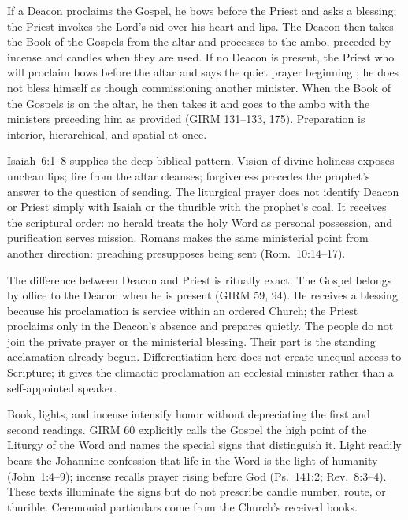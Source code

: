 
If a Deacon proclaims the Gospel, he bows before the Priest and asks a blessing; the Priest invokes the Lord's aid over his heart and lips. The Deacon then takes the Book of the Gospels from the altar and processes to the ambo, preceded by incense and candles when they are used. If no Deacon is present, the Priest who will proclaim bows before the altar and says the quiet prayer beginning ; he does not bless himself as though commissioning another minister. When the Book of the Gospels is on the altar, he then takes it and goes to the ambo with the ministers preceding him as provided (GIRM 131--133, 175). Preparation is interior, hierarchical, and spatial at once.

Isaiah~6:1--8 supplies the deep biblical pattern. Vision of divine holiness exposes unclean lips; fire from the altar cleanses; forgiveness precedes the prophet's answer to the question of sending. The liturgical prayer does not identify Deacon or Priest simply with Isaiah or the thurible with the prophet's coal. It receives the scriptural order: no herald treats the holy Word as personal possession, and purification serves mission. Romans makes the same ministerial point from another direction: preaching presupposes being sent (Rom.~10:14--17).

The difference between Deacon and Priest is ritually exact. The Gospel belongs by office to the Deacon when he is present (GIRM 59, 94). He receives a blessing because his proclamation is service within an ordered Church; the Priest proclaims only in the Deacon's absence and prepares quietly. The people do not join the private prayer or the ministerial blessing. Their part is the standing acclamation already begun. Differentiation here does not create unequal access to Scripture; it gives the climactic proclamation an ecclesial minister rather than a self-appointed speaker.

Book, lights, and incense intensify honor without depreciating the first and second readings. GIRM 60 explicitly calls the Gospel the high point of the Liturgy of the Word and names the special signs that distinguish it. Light readily bears the Johannine confession that life in the Word is the light of humanity (John~1:4--9); incense recalls prayer rising before God (Ps.~141:2; Rev.~8:3--4). These texts illuminate the signs but do not prescribe candle number, route, or thurible. Ceremonial particulars come from the Church's received books.

